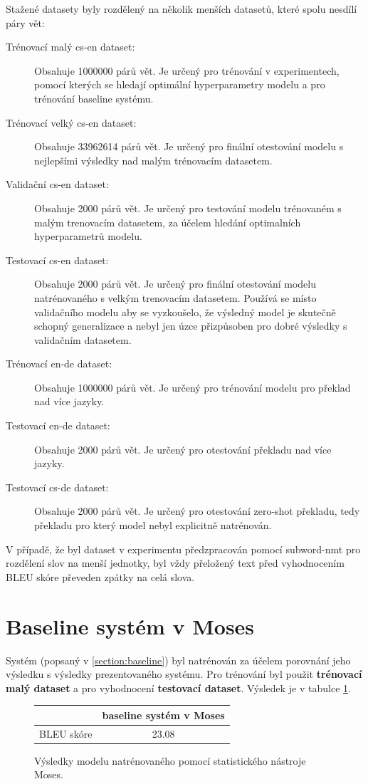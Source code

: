 Stažené datasety byly rozdělený na několik menších datasetů, které spolu nesdílí páry vět:
\begin{description}
  \item[Trénovací malý cs-en dataset:] Obsahuje 1000000 párů vět. Je určený pro trénování v experimentech, pomocí kterých se hledají optimální hyperparametry modelu a pro trénování baseline systému.
  \item[Trénovací velký cs-en dataset:] Obsahuje 33962614 párů vět. Je určený pro finální otestování modelu s nejlepšími výsledky nad malým trénovacím datasetem.
  \item[Validační cs-en dataset:] Obsahuje 2000 párů vět. Je určený pro testování modelu trénovaném s malým trenovacím datasetem, za účelem hledání optimalních hyperparametrů modelu.
  \item[Testovací cs-en dataset:] Obsahuje 2000 párů vět. Je určený pro finální otestování modelu natrénovaného s velkým trenovacím datasetem. Používá se místo validačního modelu aby se vyzkoušelo, že výsledný model je skutečně schopný generalizace a nebyl jen úzce přizpůsoben pro dobré výsledky s validačním datasetem.
  \item[Trénovací en-de dataset:] Obsahuje 1000000 párů vět. Je určený pro trénování modelu pro překlad nad více jazyky.
  \item[Testovací en-de dataset:] Obsahuje 2000 párů vět. Je určený pro otestování překladu nad více jazyky.
  \item[Testovací cs-de dataset:] Obsahuje 2000 párů vět. Je určený pro otestování zero-shot překladu, tedy překladu pro který model nebyl explicitně natrénován.
\end{description}

V případě, že byl dataset v experimentu předzpracován pomocí subword-nmt pro rozdělení slov na menší jednotky, byl vždy přeložený text před vyhodnocením BLEU skóre převeden zpátky na celá slova.

\section{Baseline systém v Moses}
Systém (popsaný v \ref{section:baseline}) byl natrénován za účelem porovnání jeho výsledku s výsledky prezentovaného systému. Pro trénování byl použit \textbf{trénovací malý dataset} a pro vyhodnocení \textbf{testovací dataset}. Výsledek je v tabulce \ref{table:baseline}.

\begin{figure}[H]
    \begin{center}
        \begin{tabular}{c|c}
          & baseline systém v Moses  \\
          \hline
          BLEU skóre & 23.08\\
          \hline
        \end{tabular}
    \end{center}
	\caption{Výsledky modelu natrénovaného pomocí statistického nástroje Moses.}
	\label{table:baseline}
\end{figure}

